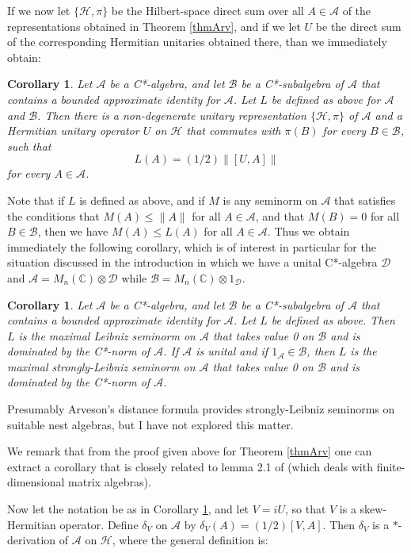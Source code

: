 \documentclass[12pt]{amsart}
\newcommand{\<}{\langle}
\renewcommand{\>}{\rangle}
\renewcommand{\d}{\delta}
\newcommand{\cA}{{\mathcal A}}
\newcommand{\cB}{{\mathcal B}}
\newcommand{\cD}{{\mathcal D}}
\newcommand{\cH}{{\mathcal H}}
\newcommand{\bC}{{\mathbb C}}
\newtheorem{corollary}[theorem]{Corollary}
\theoremstyle{definition}   %
\begin{document}
If we now let $\{\cH, \pi\}$ be the Hilbert-space direct sum over all
$A \in \cA$ of the representations obtained in Theorem \ref{thmArv},
and if we let $U$ be the direct sum of the corresponding Hermitian
unitaries obtained there, than we immediately obtain:

\begin{corollary}
\label{corsingle}
Let $\cA$ be a C*-algebra, and let $\cB$ be a C*-subalgebra of $\cA$ that  
contains a bounded approximate identity for $\cA$.
Let $L$ be defined as above for $\cA$ and $\cB$. Then there is a non-degenerate unitary
representation $\{\cH, \pi\}$ of $\cA$ and a Hermitian unitary operator
$U$ on $\cH$ that commutes with $\pi(B)$ for every $B \in \cB$, such that
\[
L(A) = (1/2)\| [U, A]\|
\]
for every $A\in \cA$.
\end{corollary}

Note that if $L$ is defined as above, and if $M$ is any seminorm on $\cA$ that satisfies the conditions
that $M(A) \leq \|A\|$ for all $A \in \cA$, and 
that $M(B) = 0$ for all $B \in \cB$,
then we have $M(A) \leq L(A)$ for all $A \in \cA$. Thus we obtain 
immediately the following corollary, which is of interest in particular
for the situation discussed in the introduction
in which we have a unital C*-algebra $\cD$ and 
$\cA = M_n(\bC) \otimes \cD$ while $\cB = M_n(\bC) \otimes 1_\cD$.

\begin{corollary}
\label{cormax}
Let $\cA$ be a C*-algebra, and let $\cB$ be a C*-subalgebra of $\cA$
that contains a bounded approximate identity for $\cA$.
Let $L$ be defined as above. Then $L$ is the maximal Leibniz
seminorm on $\cA$ that takes value 0 on $\cB$ and is dominated by
the C*-norm of $\cA$. If $\cA$ is unital and if $1_\cA \in \cB$, then $L$ is
the maximal strongly-Leibniz seminorm on $\cA$ that takes 
value 0 on $\cB$ and is dominated by
the C*-norm of $\cA$.

\end{corollary}

Presumably Arveson's distance formula provides strongly-Leibniz
seminorms on suitable nest algebras, but I have not explored this matter.

We remark that from the proof given above for Theorem \ref{thmArv} one can
extract a corollary that is closely related to lemma 2.1 of \cite{HLT} (which deals
with finite-dimensional matrix algebras).

Now let the notation be as in Corollary \ref{corsingle}, and let $V = iU$,
so that $V$ is a skew-Hermitian operator. Define $\d_V$ on $\cA$
by $\d_V(A) = (1/2)[V, A]$. Then $\d_V$ is a $*$-derivation
of $\cA$ on $\cH$, where the general definition is:
\end{document}
